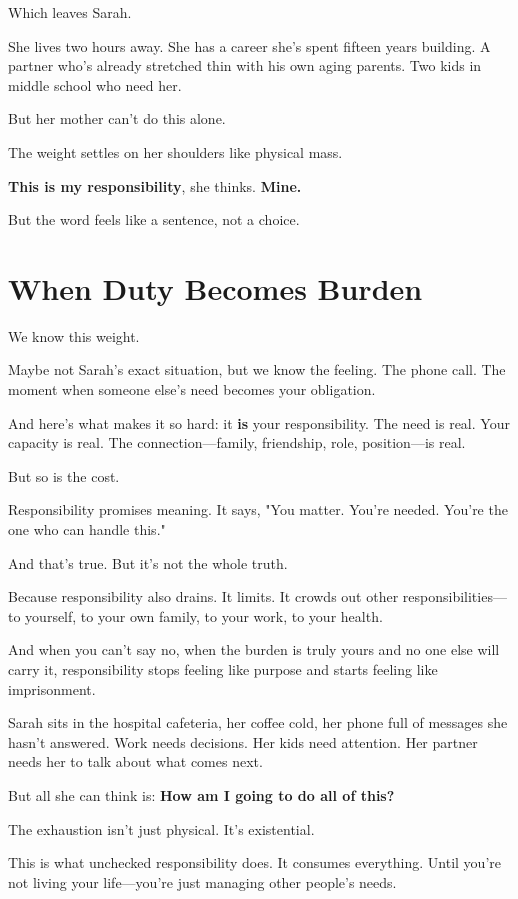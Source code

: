 \documentclass[11pt,twoside]{book}
\begin{document}
Which leaves Sarah.

She lives two hours away. She has a career she's spent fifteen years building. A partner who's already stretched thin with his own aging parents. Two kids in middle school who need her.

But her mother can't do this alone.

The weight settles on her shoulders like physical mass.

\textbf{This is my responsibility}, she thinks. \textbf{Mine.}

But the word feels like a sentence, not a choice.

\section*{When Duty Becomes Burden}

We know this weight.

Maybe not Sarah's exact situation, but we know the feeling. The phone call. The moment when someone else's need becomes your obligation.

And here's what makes it so hard: it \textbf{is} your responsibility. The need is real. Your capacity is real. The connection—family, friendship, role, position—is real.

But so is the cost.

Responsibility promises meaning. It says, "You matter. You're needed. You're the one who can handle this."

And that's true. But it's not the whole truth.

Because responsibility also drains. It limits. It crowds out other responsibilities—to yourself, to your own family, to your work, to your health.

And when you can't say no, when the burden is truly yours and no one else will carry it, responsibility stops feeling like purpose and starts feeling like imprisonment.

Sarah sits in the hospital cafeteria, her coffee cold, her phone full of messages she hasn't answered. Work needs decisions. Her kids need attention. Her partner needs her to talk about what comes next.

But all she can think is: \textbf{How am I going to do all of this?}

The exhaustion isn't just physical. It's existential.

This is what unchecked responsibility does. It consumes everything. Until you're not living your life—you're just managing other people's needs.
\end{document}
